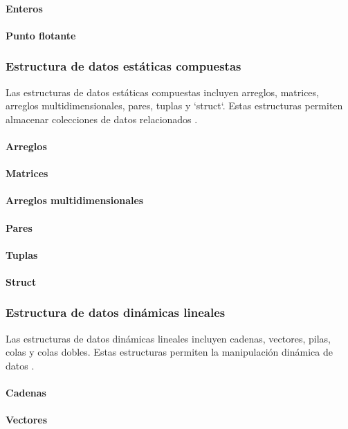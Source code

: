\paragraph{Enteros}
\paragraph{Punto flotante}

\subsubsection{Estructura de datos estáticas compuestas}
Las estructuras de datos estáticas compuestas incluyen arreglos, matrices, arreglos multidimensionales, pares, tuplas y `struct`. Estas estructuras permiten almacenar colecciones de datos relacionados \cite{stroustrup2013c++}.
\paragraph{Arreglos}
\paragraph{Matrices}
\paragraph{Arreglos multidimensionales}
\paragraph{Pares}
\paragraph{Tuplas}
\paragraph{Struct}

\subsubsection{Estructura de datos dinámicas lineales}
Las estructuras de datos dinámicas lineales incluyen cadenas, vectores, pilas, colas y colas dobles. Estas estructuras permiten la manipulación dinámica de datos \cite{stroustrup2013c++}.
\paragraph{Cadenas}
\paragraph{Vectores}

